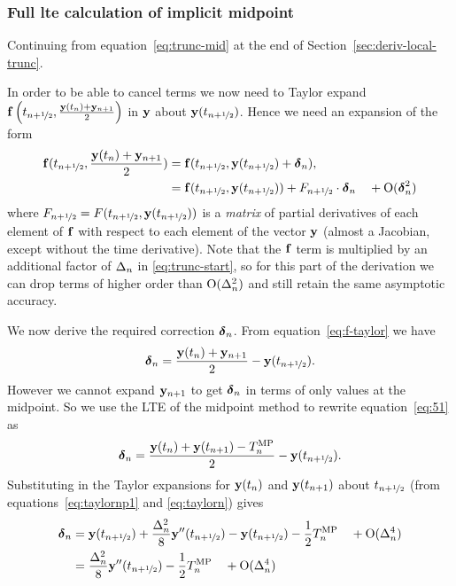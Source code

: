 \subsubsection{Full lte calculation of implicit midpoint}
\label{sec:full-imr-lte-calculation}

Continuing from equation~\eqref{eq:trunc-mid} at the end of Section~\ref{sec:deriv-local-trunc}.

In order to be able to cancel terms we now need to Taylor expand ${\mathbf{f}}\left( t_{n+\nicefrac{1}{2}}, \frac{\mathbf{y}(t_n) + \mathbf{y}_{n+1}}{2} \right)$ in $\mathbf{y}$ about $\mathbf{y}(t_{n+\nicefrac{1}{2}})$.
Hence we need an expansion of the form
\begin{align}
  \fv(\thf, \frac{\yv(t_n) + \yv_{n+1}}{2}) &= \fv(\thf, \yvhf + \dyn),
  \notag \\
  &= \fv(\thf, \yvhf) + \dfdyhf \cdot \dyn  \porder{\dyn^2}
  \label{eq:f-taylor}
\end{align}
where $F_{n+\nicefrac{1}{2}} = F(t_{n+\nicefrac{1}{2}}, \mathbf{y}(t_{n+\nicefrac{1}{2}}))$ is a \emph{matrix} of partial derivatives of each element of ${\mathbf{f}}$ with respect to each element of the vector $\mathbf{y}$ (\ie almost a Jacobian, except without the time derivative).
Note that the ${\mathbf{f}}$ term is multiplied by an additional factor of $\Delta_{n}$ in \eqref{eq:trunc-start}, so for this part of the derivation we can drop terms of higher order than $\text{O}(\Delta_{n}^2)$ and still retain the same asymptotic accuracy.

We now derive the required correction $\mbox{\boldmath$\delta$}_{n}$.
From equation~\eqref{eq:f-taylor} we have
\begin{equation}
  \dyn = \frac{\yv(t_n) + \yv_{n+1}}{2} - \yvhf.
  \label{eq:51}
\end{equation}
However we cannot expand $\mathbf{y}_{n+1}$ to get $\mbox{\boldmath$\delta$}_{n}$ in terms of only values at the midpoint.
So we use the LTE of the midpoint method to rewrite equation~\eqref{eq:51} as
\begin{equation}
  \mbox{\boldmath$\delta$}_{n} = \frac{\mathbf{y}(t_n) + \mathbf{y}(t_{n+1}) - T_n^{\text{MP}}}{2} - \mathbf{y}(t_{n+\nicefrac{1}{2}}).
\end{equation}
Substituting in the Taylor expansions for $\mathbf{y}(t_n)$ and $\mathbf{y}(t_{n+1})$ about $t_{n+\nicefrac{1}{2}}$ (from equations~\eqref{eq:taylornp1} and \eqref{eq:taylorn}) gives
\begin{align}
  \dyn &= \yvhf + \frac{\dtn^2}{8} \yvhf[''] - \yvhf - \frac{1}{2} \lte^\IMP \porder{\dtn^4} \notag\\
  &= \frac{\dtn^2}{8} \yvhf[''] - \frac{1}{2} \lte^\IMP \porder{\dtn^4}
  \label{eq:dy-value}
\end{align}



